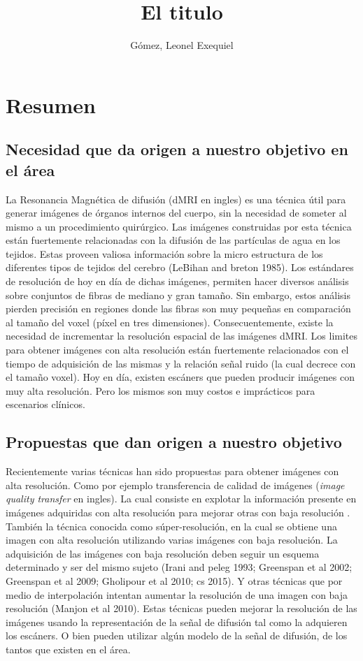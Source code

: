 \documentclass[a4paper,10pt]{article}
\title{El titulo}
\author{Gómez, Leonel Exequiel}
\begin{document}
\maketitle

\section{Resumen}

\subsection{Necesidad que da origen a nuestro objetivo en el área}
La Resonancia Magnética de difusión (dMRI en ingles) es una técnica útil para generar imágenes de 
órganos internos del 
cuerpo, sin la necesidad de someter al mismo a un procedimiento quirúrgico. Las imágenes construidas por esta técnica 
están fuertemente relacionadas con la difusión de las partículas de agua en los tejidos. Estas proveen valiosa 
información sobre la micro estructura de los diferentes tipos de tejidos del cerebro (LeBihan and 
breton 1985). Los estándares de resolución de hoy en día de dichas imágenes, permiten hacer 
diversos análisis sobre conjuntos de fibras de mediano y gran tamaño. Sin embargo, estos análisis 
pierden precisión en regiones donde las fibras son muy pequeñas en comparación 
al tamaño del voxel (píxel en tres dimensiones). Consecuentemente, existe la necesidad de 
incrementar la resolución espacial de las imágenes dMRI. Los limites para 
obtener imágenes con alta resolución están fuertemente relacionados con el 
tiempo de adquisición de las mismas y la relación señal ruido (la cual decrece 
con el tamaño voxel). Hoy en día, existen escáners que pueden 
producir imágenes con muy alta resolución. Pero los mismos son muy costos e 
imprácticos para escenarios clínicos.


\subsection{Propuestas que dan origen a nuestro objetivo}
Recientemente varias técnicas han sido propuestas para obtener imágenes con alta resolución. Como 
por ejemplo 
transferencia de calidad de imágenes (\textit{image quality transfer} en ingles). La cual 
consiste en explotar la 
información presente en imágenes adquiridas con alta resolución para mejorar otras con baja resolución 
\citep{Alexander2014}. También la técnica conocida como súper-resolución, en 
la cual se obtiene una imagen con alta resolución utilizando varias imágenes con baja resolución. 
La adquisición de las imágenes con baja 
resolución deben seguir un esquema determinado y ser del mismo sujeto (Irani and peleg 1993; Greenspan et al 
2002; Greenspan et al 2009; Gholipour et al 2010; cs 2015). Y otras técnicas que por medio de interpolación 
intentan aumentar la resolución de una imagen con baja resolución (Manjon et al 2010). Estas técnicas pueden mejorar la 
resolución de las imágenes usando la representación de la señal de difusión tal como la adquieren los escáners. O bien 
pueden utilizar algún modelo de la señal de difusión, de los tantos que existen en el área.
\end{document}
